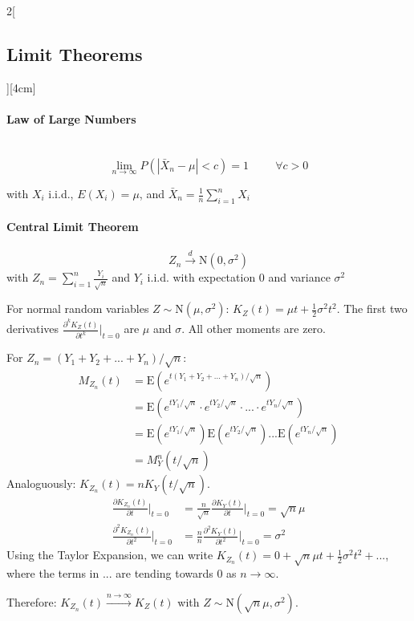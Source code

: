 \documentclass[8pt]{extarticle}
\begin{document}
\begin{multicols}{2}[\subsection{Limit Theorems}][4cm]

  \paragraph{Law of Large Numbers} \ \\
  
  $$\lim_{n\rightarrow \infty} P\left(\left|\bar{X}_n {-} \mu\right| < c\right)=1 \hspace{1cm} \forall c>0$$
  
  \noindent with $X_i$ i.i.d., $E(X_i)=\mu$, and $\bar{X}_n = \frac{1}{n} \sum_{i=1}^n X_i$
  
  \paragraph{Central Limit Theorem}
  
  $$Z_n \overset{d}{\longrightarrow} \mathrm{N}(0, \sigma^2)$$
  with  $Z_n = \sum_{i=1}^{n} \frac{Y_i}{\sqrt{n}}$ and $Y_i$ i.i.d. with expectation $0$ and variance $\sigma^2$
  
\begin{Proof}
For normal random variables $Z \sim \mathrm{N}(\mu, \sigma^2)$: $K_Z(t)=\mu t + \frac{1}{2}\sigma^2t^2$. The first two derivatives $\frac{\partial^kK_Z(t)}{\partial t^k} \bigg|_{t = 0}$ are $\mu$ and $\sigma$. All other moments are zero. 

\noindent For $Z_n = (Y_1 + Y_2 + ... +Y_n)/\sqrt{n}$:
\begin{align*}
M_{Z_n}(t) &= \mathrm{E}\left(e^{t(Y_1 + Y_2 + ... +Y_n)/\sqrt{n}}\right)\\
&= \mathrm{E}\left(e^{tY_1/\sqrt{n}} \cdot e^{tY_2/\sqrt{n}}\cdot ... \cdot e^{tY_n/\sqrt{n}}\right) \\
&= \mathrm{E}\left(e^{tY_1/\sqrt{n}}\right) \mathrm{E}\left(e^{tY_2/\sqrt{n}}\right) ... \mathrm{E}\left(e^{tY_n/\sqrt{n}}\right) \\
&= M_Y^n(t/\sqrt{n})
\end{align*}
Analoguously: $K_{Z_n}(t) = nK_Y(t/\sqrt{n})$.
\begin{align*}
 \frac{\partial K_{Z_n}(t)}{\partial t} \bigg|_{t = 0} &= \frac{n}{\sqrt{n}} \frac{\partial K_Y(t)}{\partial t} \bigg|_{t = 0} = \sqrt{n}\mu \\
 \frac{\partial^2K_{Z_n}(t)}{\partial t^2} \bigg|_{t = 0} &= \frac{n}{n} \frac{\partial^2 K_Y(t)}{\partial t^2} \bigg|_{t = 0} = \sigma^2
\end{align*}
Using the Taylor Expansion, we can write $K_{Z_n}(t) = 0 + \sqrt{n}\mu t + \frac{1}{2}\sigma^2t^2 + ...$, where the terms in $...$ are tending towards 0 as $n \rightarrow \infty$.

\noindent Therefore: $K_{Z_n}(t) \overset{n\rightarrow\infty}{\longrightarrow} K_{Z}(t)$ with $Z \sim \mathrm{N}(\sqrt{n}\mu,\sigma^2)$.
\end{Proof}

\end{multicols}
\end{document}
